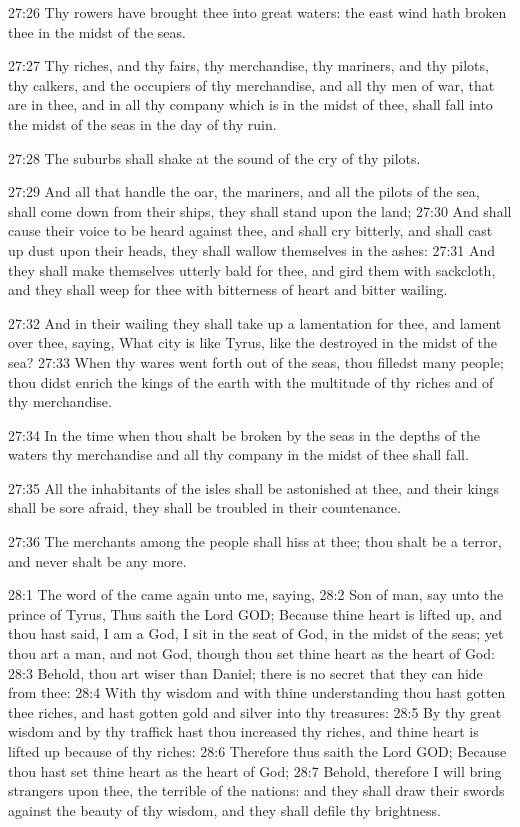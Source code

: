 27:26 Thy rowers have brought thee into great waters: the east wind hath broken thee in the midst of the seas.

27:27 Thy riches, and thy fairs, thy merchandise, thy mariners, and thy pilots, thy calkers, and the occupiers of thy merchandise, and all thy men of war, that are in thee, and in all thy company which is in the midst of thee, shall fall into the midst of the seas in the day of thy ruin.

27:28 The suburbs shall shake at the sound of the cry of thy pilots.

27:29 And all that handle the oar, the mariners, and all the pilots of the sea, shall come down from their ships, they shall stand upon the land; 27:30 And shall cause their voice to be heard against thee, and shall cry bitterly, and shall cast up dust upon their heads, they shall wallow themselves in the ashes: 27:31 And they shall make themselves utterly bald for thee, and gird them with sackcloth, and they shall weep for thee with bitterness of heart and bitter wailing.

27:32 And in their wailing they shall take up a lamentation for thee, and lament over thee, saying, What city is like Tyrus, like the destroyed in the midst of the sea?  27:33 When thy wares went forth out of the seas, thou filledst many people; thou didst enrich the kings of the earth with the multitude of thy riches and of thy merchandise.

27:34 In the time when thou shalt be broken by the seas in the depths of the waters thy merchandise and all thy company in the midst of thee shall fall.

27:35 All the inhabitants of the isles shall be astonished at thee, and their kings shall be sore afraid, they shall be troubled in their countenance.

27:36 The merchants among the people shall hiss at thee; thou shalt be a terror, and never shalt be any more.

28:1 The word of the \LORD came again unto me, saying, 28:2 Son of man, say unto the prince of Tyrus, Thus saith the Lord GOD; Because thine heart is lifted up, and thou hast said, I am a God, I sit in the seat of God, in the midst of the seas; yet thou art a man, and not God, though thou set thine heart as the heart of God: 28:3 Behold, thou art wiser than Daniel; there is no secret that they can hide from thee: 28:4 With thy wisdom and with thine understanding thou hast gotten thee riches, and hast gotten gold and silver into thy treasures: 28:5 By thy great wisdom and by thy traffick hast thou increased thy riches, and thine heart is lifted up because of thy riches: 28:6 Therefore thus saith the Lord GOD; Because thou hast set thine heart as the heart of God; 28:7 Behold, therefore I will bring strangers upon thee, the terrible of the nations: and they shall draw their swords against the beauty of thy wisdom, and they shall defile thy brightness.

